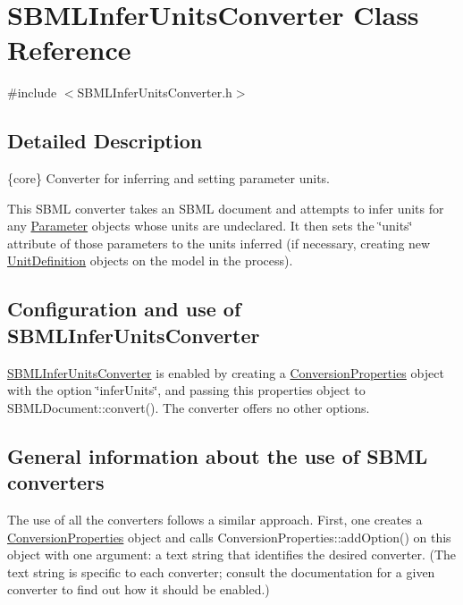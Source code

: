 \hypertarget{class_s_b_m_l_infer_units_converter}{}\section{S\+B\+M\+L\+Infer\+Units\+Converter Class Reference}
\label{class_s_b_m_l_infer_units_converter}


{\ttfamily \#include $<$S\+B\+M\+L\+Infer\+Units\+Converter.\+h$>$}



\subsection{Detailed Description}
\{core\} Converter for inferring and setting parameter units.



This S\+B\+ML converter takes an S\+B\+ML document and attempts to infer units for any \hyperlink{class_parameter}{Parameter} objects whose units are undeclared. It then sets the \char`\"{}units\char`\"{} attribute of those parameters to the units inferred (if necessary, creating new \hyperlink{class_unit_definition}{Unit\+Definition} objects on the model in the process).\hypertarget{class_s_b_m_l_infer_units_converter_SBMLInferUnitsConverter-usage}{}\subsection{Configuration and use of S\+B\+M\+L\+Infer\+Units\+Converter}\label{class_s_b_m_l_infer_units_converter_SBMLInferUnitsConverter-usage}
\hyperlink{class_s_b_m_l_infer_units_converter}{S\+B\+M\+L\+Infer\+Units\+Converter} is enabled by creating a \hyperlink{class_conversion_properties}{Conversion\+Properties} object with the option {\ttfamily \char`\"{}infer\+Units\char`\"{}}, and passing this properties object to S\+B\+M\+L\+Document\+::convert(). The converter offers no other options.\hypertarget{classdoc__section__using__sbml__converters_using-converters}{}\subsection{General information about the use of S\+B\+M\+L converters}\label{classdoc__section__using__sbml__converters_using-converters}
The use of all the converters follows a similar approach. First, one creates a \hyperlink{class_conversion_properties}{Conversion\+Properties} object and calls Conversion\+Properties\+::add\+Option() on this object with one argument\+: a text string that identifies the desired converter. (The text string is specific to each converter; consult the documentation for a given converter to find out how it should be enabled.)


